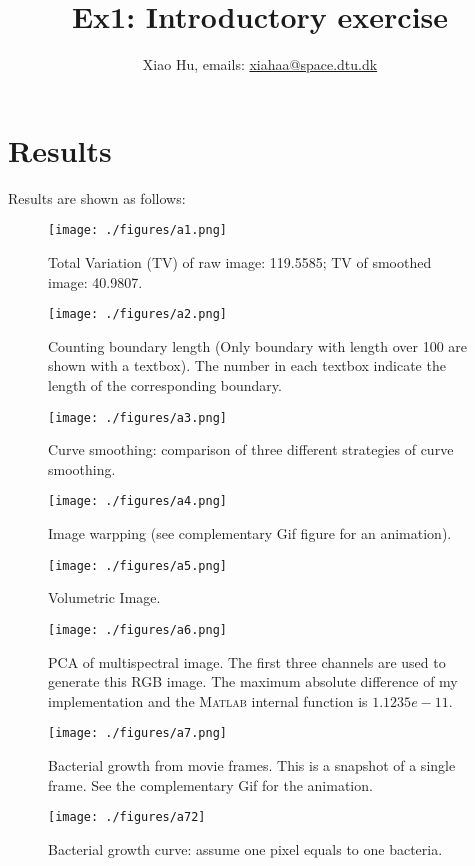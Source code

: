 \documentclass[a4paper]{article}
\title{Ex1: Introductory exercise}
\author{Xiao Hu, emails: \url{xiahaa@space.dtu.dk}}
\begin{document}
	\maketitle
	\thispagestyle{empty}
\section{Results}
Results are shown as follows:
\begin{figure}[H]
\centering
\texttt{[image: ./figures/a1.png]}
\caption{Total Variation (TV) of raw image: 119.5585; TV of smoothed image: 40.9807.}
\end{figure}
\begin{figure}[H]
	\centering
	\texttt{[image: ./figures/a2.png]}
	\caption{Counting boundary length (Only boundary with length over 100 are shown with a textbox). The number in each textbox indicate the length of the corresponding boundary.}
\end{figure}
\begin{figure}[H]
	\centering
	\texttt{[image: ./figures/a3.png]}
	\caption{Curve smoothing: comparison of three different strategies of curve smoothing.}
\end{figure}
\begin{figure}[H]
	\centering
	\texttt{[image: ./figures/a4.png]}
	\caption{Image warpping (see complementary Gif figure for an animation).}
\end{figure}
\begin{figure}[H]
	\centering
	\texttt{[image: ./figures/a5.png]}
	\caption{Volumetric Image.}
\end{figure}

\begin{figure}[H]
	\centering
	\texttt{[image: ./figures/a6.png]}
	\caption{PCA of multispectral image. The first three channels are used to generate this RGB image. The maximum absolute difference of my implementation and the \textsc{Matlab} internal function is $1.1235e-11$.}
\end{figure}



\begin{figure}
	\centering
	\texttt{[image: ./figures/a7.png]}
	\caption{Bacterial growth from movie frames. This is a snapshot of a single frame. See the complementary Gif for the animation.}
	\texttt{[image: ./figures/a72]}
	\caption{Bacterial growth curve: assume one pixel equals to one bacteria.}
\end{figure}

% 
%
\end{document}

